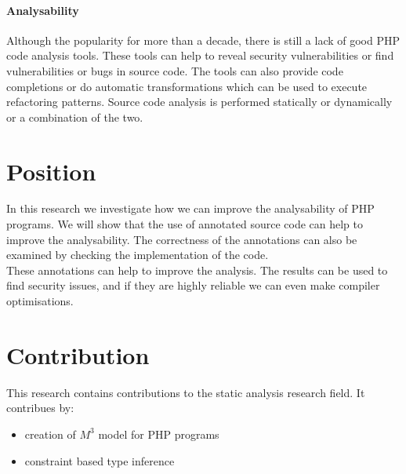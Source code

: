 \documentclass[../main.tex]{subfiles}
\begin{document}
        \paragraph{Analysability}
        Although the popularity for more than a decade, there is still a lack of good PHP code analysis tools.
        These tools can help to reveal security vulnerabilities or find vulnerabilities or bugs in source code.
        The tools can also provide code completions or do automatic transformations which can be used to execute refactoring patterns.
        Source code analysis is performed statically or dynamically or a combination of the two.
                
    \section{Position} %
        In this research we investigate how we can improve the analysability of PHP programs.
        We will show that the use of annotated source code can help to improve the analysability.
        The correctness of the annotations can also be examined by checking the implementation of the code. 
        \\
        These annotations can help to improve the analysis.
        The results can be used to find security issues, and if they are highly reliable we can even make compiler optimisations.
       
    \section{Contribution} %
        This research contains contributions to the static analysis research field.
        It contribues by:
        \begin{itemize}
            \item creation of $M^3$ model for PHP programs
            \item constraint based type inference
        \end{itemize}
\end{document}
